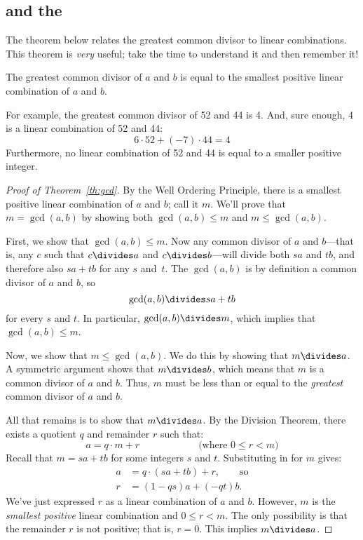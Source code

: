 \iffalse
\begin{editingnotes}
\subsection{ and the }

The theorem below relates the greatest common divisor to linear
combinations.  This theorem is \emph{very} useful; take the time to
understand it and then remember it!

\begin{theorem} \label{th:gcd} The greatest common divisor of $a$ and $b$ is equal to
the smallest positive linear combination of $a$ and $b$.
\end{theorem}

For example, the greatest common divisor of 52 and 44 is 4.  And, sure
enough, 4 is a linear combination of 52 and 44:
\[
6 \cdot 52 + (-7) \cdot 44 = 4
\]
Furthermore, no linear combination of 52 and 44 is equal to a smaller
positive integer.

\begin{proof}[Proof of Theorem~\ref{th:gcd}]
By the Well Ordering Principle, there is a smallest positive linear
combination of $a$ and $b$; call it $m$.  We'll prove that $m =
\gcd(a, b)$ by showing both $\gcd(a, b) \leq m$ and $m \leq \gcd(a,
b)$.

First, we show that $\gcd(a, b) \leq m$.  Now any common divisor of
$a$ and $b$---that is, any $c$ such that $c \divides a$ and $c
\divides b$---will divide both $sa$ and $tb$, and therefore also
$sa+tb$ for any $s$ and~$t$.  The $\gcd(a, b)$ is by definition a
common divisor of $a$ and $b$, so
\begin{equation}\label{gcdabdivlin} \gcd(a, b)
\divides s a + t b
\end{equation}
for every $s$ and $t$.  In particular, $\gcd(a, b) \divides m$, which
implies that $\gcd(a, b) \leq m$.

Now, we show that $m \leq \gcd(a, b)$.  We do this by showing that $m
\divides a$.  A symmetric argument shows that $m \divides b$, which
means that $m$ is a common divisor of $a$ and $b$.  Thus, $m$ must be
less than or equal to the \emph{greatest} common divisor of $a$ and
$b$.

All that remains is to show that $m \divides a$.  By the Division
Theorem, there exists a quotient $q$ and remainder $r$ such that:
\[
a = q \cdot m + r \hspace{1in} \text{(where $0 \leq r < m$)} \] Recall
that $m = s a + t b$ for some integers $s$ and $t$.  Substituting in
for $m$ gives:
\begin{align*} a & = q \cdot (s a + t b) + r,
\qquad \text{so} \\
r & = (1 - qs) a + (-qt) b.
\end{align*}
We've just expressed $r$ as a linear combination of $a$ and $b$.
However, $m$ is the \emph{smallest positive} linear combination and $0
\leq r < m$.  The only possibility is that the remainder $r$ is not
positive; that is, $r = 0$.  This implies $m \divides a$.  \end{proof}


\end{editingnotes}

